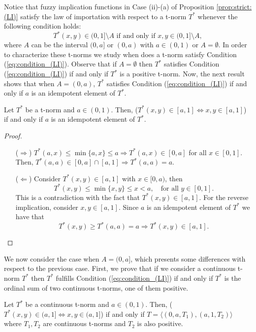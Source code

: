 Notice that fuzzy implication functions in Case (ii)-(a) of Proposition \ref{prop:strict:(LI)} satisfy the law of importation with respect to a t-norm $T^*$ whenever the following condition holds:
\begin{equation}
	T^*(x,y) \in (0,1] \setminus A \text{ if and only if } x,y \in (0,1] \setminus A,
	\label{eq:condition_(LI)}
\end{equation}
where $A$ can be the interval $(0,a]$ or $(0,a)$ with $a \in (0,1)$ or $A=\emptyset$. In order to characterize these t-norms we study when does a t-norm satisfy Condition (\ref{eq:condition_(LI)}). Observe that if $A=\emptyset$ then $T^*$ satisfies Condition (\ref{eq:condition_(LI)}) if and only if $T^*$ is a positive t-norm. Now, the next result shows that when $A=(0,a)$, $T^*$ satisfies Condition (\ref{eq:condition_(LI)}) if and only if $a$ is an idempotent element of $T^*$.
\begin{lemma}\label{lem:(LI)Tcont(1)}
	Let $T^*$ be a t-norm and $a\in(0,1)$. Then, {\normalfont(}$T^*(x,y) \in [a,1] \Leftrightarrow x,y \in [a,1]${\normalfont)} if and only if $a$ is an idempotent element of $T^*$.
\end{lemma}
\begin{proof}\hspace{0.5cm}
	\begin{itemize}
		\item[($\Rightarrow$)] $T^*(a,x) \leq \min\{a,x\} \leq a \Rightarrow T^*(a,x) \in [0,a]$ for all $x \in [0,1]$. Then, $T^*(a,a)\in [0,a]\cap[a,1] \Rightarrow T^*(a,a)=a$.
		\item[($\Leftarrow$)] Consider $T^*(x,y) \in [a,1]$ with $x \in [0,a)$, then
		$$T^*(x,y) \leq \min\{x,y\} \leq x < a, \quad \text{for all } y \in [0,1].$$
		This is a contradiction with the fact that $T^*(x,y) \in [a,1]$. For the reverse implication, consider $x,y \in [a,1]$. Since $a$ is an idempotent element of $T^*$ we have that
		$$T^*(x,y) \geq T^*(a,a)=a \Rightarrow T^*(x,y)\in [a,1].$$
	\end{itemize}
\end{proof}
We now consider the case when $A=(0,a]$, which presents some differences with respect to the previous case. First, we prove that if we consider a continuous t-norm $T^*$ then $T^*$ fulfills Condition (\ref{eq:condition_(LI)}) if and only if $T^*$ is the ordinal sum of two continuous t-norms, one of them positive.
\begin{lemma}\label{lem:(LI)Tcont(2)}
	Let $T^*$ be a continuous t-norm and $a \in (0,1)$. Then, {\normalfont(}$T^*(x,y) \in (a,1] \Leftrightarrow x,y \in (a,1]${\normalfont)} if and only if $T=\langle (0,a,T_1),(a,1,T_2)\rangle$ where $T_1, T_2$ are continuous t-norms and $T_2$ is also positive.
\end{lemma}
